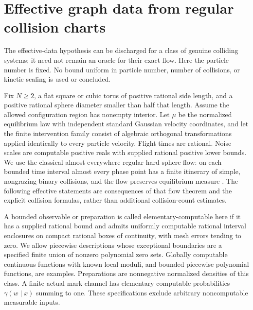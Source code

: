 \section{Effective graph data from regular collision charts}
\label{sec:v15-effective-physical}
The effective-data hypothesis can be discharged for a class of genuine
colliding systems; it need not remain an oracle for their exact flow.
Here the particle number is fixed. No bound uniform in particle number,
number of collisions, or kinetic scaling is used or concluded.

Fix $N\ge2$, a flat square or cubic torus of positive rational side
length, and a positive rational sphere diameter smaller than half that
length. Assume the allowed configuration region has nonempty interior.
Let $\mu$ be the normalized equilibrium law with independent standard
Gaussian velocity coordinates, and let the finite intervention family
consist of algebraic orthogonal transformations applied identically
to every particle velocity.
Flight times are rational. Noise scales are computable positive reals
with supplied rational positive lower bounds. We use the classical almost-everywhere
regular hard-sphere flow: on each bounded time interval almost every
phase point has a finite itinerary of simple, nongrazing binary
collisions, and the flow preserves equilibrium measure
\cite{GallagherSaintRaymondTexier}. The following effective statements
are consequences of that flow theorem and the explicit collision
formulas, rather than additional collision-count estimates.

A bounded observable or preparation is called elementary-computable
here if it has a supplied rational bound and admits uniformly computable
rational interval enclosures on compact rational boxes of continuity,
with mesh errors tending to zero. We allow piecewise descriptions whose
exceptional boundaries are a specified finite union of nonzero
polynomial zero sets. Globally computable continuous functions with
known local moduli, and bounded piecewise polynomial functions, are
examples. Preparations are nonnegative normalized densities of this
class. A finite actual-mark channel has elementary-computable
probabilities $\gamma(w\mid x)$ summing to one. These specifications
exclude arbitrary noncomputable measurable inputs.

